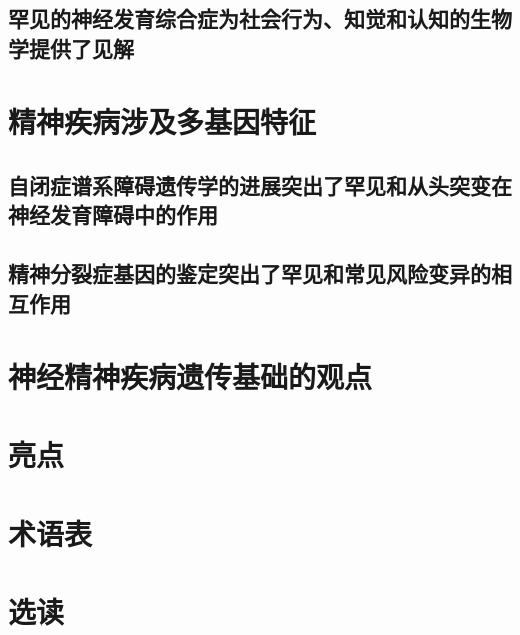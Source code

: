 \subsection{罕见的神经发育综合症为社会行为、知觉和认知的生物学提供了见解}

\section{精神疾病涉及多基因特征}
\subsection{自闭症谱系障碍遗传学的进展突出了罕见和从头突变在神经发育障碍中的作用}
\subsection{精神分裂症基因的鉴定突出了罕见和常见风险变异的相互作用}

\section{神经精神疾病遗传基础的观点}

\section{亮点}

\section{术语表}

\section{选读}




